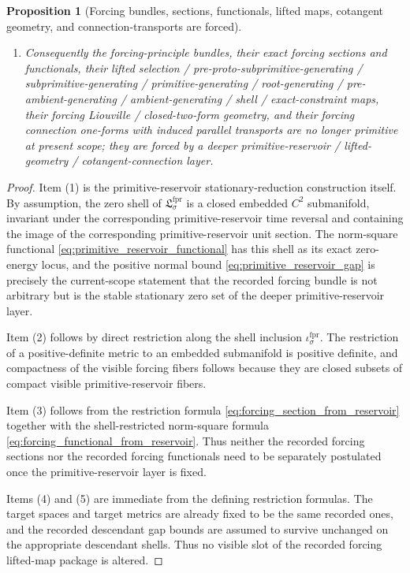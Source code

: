 \documentclass[11pt]{article}
\newcommand{\ForPrimSection}[1]{\mathfrak L_{#1}^{\mathrm{fpr}}}
\newcommand{\ForPrimInc}[1]{\iota_{#1}^{\mathrm{fpr}}}
\newtheorem{proposition}{Proposition}
\begin{document}
\begin{proposition}[Forcing bundles, sections, functionals, lifted maps, cotangent geometry, and connection-transports are forced]
\begin{enumerate}
    \item Consequently the forcing-principle bundles, their exact forcing sections and functionals, their lifted selection / pre-proto-subprimitive-generating / subprimitive-generating / primitive-generating / root-generating / pre-ambient-generating / ambient-generating / shell / exact-constraint maps, their forcing Liouville / closed-two-form geometry, and their forcing connection one-forms with induced parallel transports are no longer primitive at present scope; they are forced by a deeper primitive-reservoir / lifted-geometry / cotangent-connection layer.
\end{enumerate}
\end{proposition}

\begin{proof}
Item (1) is the primitive-reservoir stationary-reduction construction itself. By assumption, the zero shell of \(\ForPrimSection{\sigma}\) is a closed embedded \(C^2\) submanifold, invariant under the corresponding primitive-reservoir time reversal and containing the image of the corresponding primitive-reservoir unit section. The norm-square functional \eqref{eq:primitive_reservoir_functional} has this shell as its exact zero-energy locus, and the positive normal bound \eqref{eq:primitive_reservoir_gap} is precisely the current-scope statement that the recorded forcing bundle is not arbitrary but is the stable stationary zero set of the deeper primitive-reservoir layer.

Item (2) follows by direct restriction along the shell inclusion \(\ForPrimInc{\sigma}\). The restriction of a positive-definite metric to an embedded submanifold is positive definite, and compactness of the visible forcing fibers follows because they are closed subsets of compact visible primitive-reservoir fibers.

Item (3) follows from the restriction formula \eqref{eq:forcing_section_from_reservoir} together with the shell-restricted norm-square formula \eqref{eq:forcing_functional_from_reservoir}. Thus neither the recorded forcing sections nor the recorded forcing functionals need to be separately postulated once the primitive-reservoir layer is fixed.

Items (4) and (5) are immediate from the defining restriction formulas. The target spaces and target metrics are already fixed to be the same recorded ones, and the recorded descendant gap bounds are assumed to survive unchanged on the appropriate descendant shells. Thus no visible slot of the recorded forcing lifted-map package is altered.


\end{proof}
\end{document}
